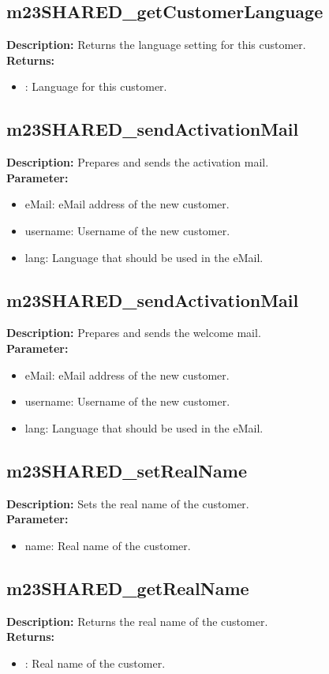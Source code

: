 \subsection{m23SHARED\_getCustomerLanguage}
\textbf{Description:} Returns the language setting for this customer.\\
\textbf{Returns:}
\begin{itemize}
\item : Language for this customer.
\end{itemize}

\subsection{m23SHARED\_sendActivationMail}
\textbf{Description:} Prepares and sends the activation mail.\\
\textbf{Parameter:}
\begin{itemize}
\item eMail: eMail address of the new customer.
\item username: Username of the new customer.
\item lang: Language that should be used in the eMail.
\end{itemize}

\subsection{m23SHARED\_sendActivationMail}
\textbf{Description:} Prepares and sends the welcome mail.\\
\textbf{Parameter:}
\begin{itemize}
\item eMail: eMail address of the new customer.
\item username: Username of the new customer.
\item lang: Language that should be used in the eMail.
\end{itemize}

\subsection{m23SHARED\_setRealName}
\textbf{Description:} Sets the real name of the customer.\\
\textbf{Parameter:}
\begin{itemize}
\item name: Real name of the customer.
\end{itemize}

\subsection{m23SHARED\_getRealName}
\textbf{Description:} Returns the real name of the customer.\\
\textbf{Returns:}
\begin{itemize}
\item : Real name of the customer.
\end{itemize}

